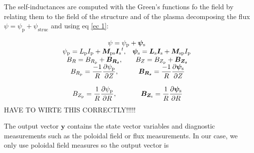 \documentclass[a4paper,12pt,oneside]{book}
\newcommand{\p}{\partial}
\begin{document}
The self-inductances are computed with the Green's functions fo the field by relating them to the field of the structure and of the plasma decomposing the flux $\psi=\psi_\text{p}+\psi_\text{struc}$ and using eq \eqref{ec 1}:

\begin{equation}
	\left.
	\begin{array}{cc}
	\multicolumn{2}{c}{\psi=\psi_\text{p}+\boldsymbol{\psi_\text{s}}} \\
	\psi_\text{p}=L_\text{p} I_\text{p}+ \boldsymbol{M_\text{ps}} \boldsymbol{I_\text{s}}^t , & 	\boldsymbol{\psi_\text{s}}=\boldsymbol{L_\text{s}} \boldsymbol{I_\text{s}}+ \boldsymbol{M_\text{sp}} I_\text{p} 
	\\
B_R=B_{R_\text{p}}+\boldsymbol{B_{R_s}}, & B_Z=B_{Z_\text{p}}+\boldsymbol{B_{Z_s}}\\
	B_{R_\text{p}}= \dfrac{-1}{R} \dfrac{\p \psi_\text{p}}{\p Z}, & 	\boldsymbol{B_{R_s}}= \dfrac{-1}{R} \dfrac{\p \boldsymbol{\psi_\text{s}}}{\p Z} 
	\\ \\
	B_{Z_\text{p}}= \dfrac{1}{R} \dfrac{\p \psi_\text{p}}{\p R}, & 	\boldsymbol{B_{Z_\text{s}}}= \dfrac{1}{R} \dfrac{\p \boldsymbol{\psi_\text{s}}}{\p R} \\
	\end{array}
	\right.
\end{equation}
HAVE TO WIRTE THIS CORRECTLY!!!!!


The output vector $\boldsymbol{y}$ contains the state vector variables and diagnostic measurements such as the poloidal field or flux measurements. In our case, we only use poloidal field measures so the output vector is
\end{document}
